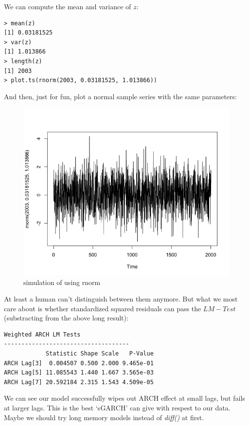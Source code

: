 \documentclass[a4paper, 11pt]{article}
\begin{document}
\indent We can compute the mean and variance of $z$:
\begin{verbatim}
> mean(z)
[1] 0.03181525
> var(z)
[1] 1.013866
> length(z)
[1] 2003
> plot.ts(rnorm(2003, 0.03181525, 1.013866))
\end{verbatim} 
\indent And then, just for fun, plot a normal sample series with the same parameters:

\begin{figure}[H]
\centering
\caption{simulation of using rnorm}
\includegraphics[scale=.40]{rnorm.png}
\end{figure}

\indent At least a human can't distinguish between them anymore. But what we most care about is whether standardized squared residuals can pass the $LM-Test$(substracting from the above long result):

\begin{verbatim}
Weighted ARCH LM Tests
------------------------------------
            Statistic Shape Scale   P-Value
ARCH Lag[3]  0.004507 0.500 2.000 9.465e-01
ARCH Lag[5] 11.085543 1.440 1.667 3.565e-03
ARCH Lag[7] 20.592184 2.315 1.543 4.509e-05
\end{verbatim}

We can see our model successfully wipes out ARCH effect at small lags, but fails at larger lags. This is the best `sGARCH' can give with respest to our data. Maybe we should try long memory models instead of \textit{diff()} at first.\par
\end{document}

